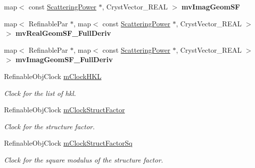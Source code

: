 \begin{DoxyCompactItemize}
map$<$ const \mbox{\hyperlink{class_obj_cryst_1_1_scattering_power}{Scattering\+Power}} $\ast$, Cryst\+Vector\+\_\+\+R\+E\+AL $>$ {\bfseries mv\+Imag\+Geom\+SF}
\item 
\mbox{\label{class_obj_cryst_1_1_scattering_data_a2bafef6981426364eac0ecc4e21856ef}} 
map$<$ Refinable\+Par $\ast$, map$<$ const \mbox{\hyperlink{class_obj_cryst_1_1_scattering_power}{Scattering\+Power}} $\ast$, Cryst\+Vector\+\_\+\+R\+E\+AL $>$ $>$ {\bfseries mv\+Real\+Geom\+S\+F\+\_\+\+Full\+Deriv}
\item 
\mbox{\label{class_obj_cryst_1_1_scattering_data_abd8ac21d5b25202503a6785b4a1ede5c}} 
map$<$ Refinable\+Par $\ast$, map$<$ const \mbox{\hyperlink{class_obj_cryst_1_1_scattering_power}{Scattering\+Power}} $\ast$, Cryst\+Vector\+\_\+\+R\+E\+AL $>$ $>$ {\bfseries mv\+Imag\+Geom\+S\+F\+\_\+\+Full\+Deriv}
\item 
\mbox{\label{class_obj_cryst_1_1_scattering_data_afad19f562c1f34565391c0a05028516f}} 
Refinable\+Obj\+Clock \mbox{\hyperlink{class_obj_cryst_1_1_scattering_data_afad19f562c1f34565391c0a05028516f}{m\+Clock\+H\+KL}}
\begin{DoxyCompactList}\small\item\em Clock for the list of hkl. \end{DoxyCompactList}\item 
\mbox{\label{class_obj_cryst_1_1_scattering_data_a182f20f79682668151ee46092dce98a2}} 
Refinable\+Obj\+Clock \mbox{\hyperlink{class_obj_cryst_1_1_scattering_data_a182f20f79682668151ee46092dce98a2}{m\+Clock\+Struct\+Factor}}
\begin{DoxyCompactList}\small\item\em Clock for the structure factor. \end{DoxyCompactList}\item 
\mbox{\label{class_obj_cryst_1_1_scattering_data_a65bf8a4033d331408ba09548eaa202d2}} 
Refinable\+Obj\+Clock \mbox{\hyperlink{class_obj_cryst_1_1_scattering_data_a65bf8a4033d331408ba09548eaa202d2}{m\+Clock\+Struct\+Factor\+Sq}}
\begin{DoxyCompactList}\small\item\em Clock for the square modulus of the structure factor. \end{DoxyCompactList}\item 

\end{DoxyCompactItemize}
